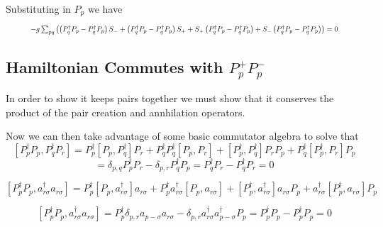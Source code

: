\documentclass[11pt]{article} %
\begin{document}
Substituting in $P_p$ we have \\

\begin{equation}
\resizebox{.9\hsize}{!}{$
-g\sum_{pq} \left(\left(P_q^\dagger P_p -P_q^\dagger  P_p\right)S_-+
\left(P_q^\dagger P_p -P_q^\dagger P_p\right)S_+ + S_+\left(P_q^\dagger P_p-P_q^\dagger P_p \right)+S_-\left(P_q^\dagger P_p-P_q ^\dagger P_p \right)\right)=0$}
\end{equation}







\subsection{Hamiltonian Commutes with $P_p^+ P_p^-$}

In order to show it keeps pairs together we must show that it conserves the product of the pair creation and annhilation operators. 


Now we can then take advantage of some basic commutator algebra to solve that\\

\begin{equation}
\left[P_p^\dagger P_p,P_q^\dagger P_r \right]=P_p^\dagger \left[P_p,P_q^\dagger\right]P_r+P_q^\dagger P_q^\dagger \left[P_p,P_r \right] +\left[P_p^\dagger,P_q^\dagger\right]P_r P_p+P_q^\dagger \left[P_p^\dagger, P_r \right]P_p\end{equation}\begin{equation}=\delta_{p,q}P_p^\dagger P_r -\delta_{p,r}P_q^\dagger P_p=P_q^\dagger P_r - P_q^\dagger P_r=0 \end{equation}

\begin{equation}
\left[P_p^\dagger P_p, a_{r \sigma}^\dagger a_{r\sigma}\right]=P_p^\dagger \left[P_p,a_{r\sigma}^\dagger\right]a_{r\sigma}+
P_p^\dagger a_{r\sigma}^\dagger \left[P_p,a_{r \sigma}\right] + \left[P_p^\dagger, a_{r\sigma}^\dagger \right] a_{r \sigma} P_p + a_{r \sigma}^\dagger \left[P_p^\dagger, a_{r \sigma} \right] P_p \end{equation}




\begin{equation}
\left[P_p^\dagger P_p, a_{r \sigma}^\dagger a_{r\sigma}\right]=P_p^\dagger\delta_{p,r} a_{p -\sigma} a_{r\sigma}-\delta_{p,r}a_{r\sigma}^\dagger a_{p-\sigma}^\dagger P_p=P_p^\dagger P_p-P_p^\dagger P_p =0\end{equation}
\end{document}
